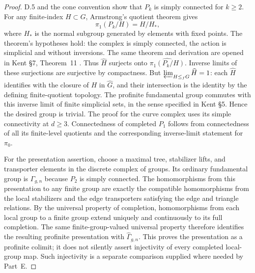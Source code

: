\begin{proof}
D.5 and the cone convention show that $P_k$ is simply connected for $k\geq2$. For any finite-index $H\subset G$, Armstrong's quotient theorem gives
\[
 \pi_1(P_k/H)=H/H_*,
\]
where $H_*$ is the normal subgroup generated by elements with fixed points. The theorem's hypotheses hold: the complex is simply connected, the action is simplicial and without inversions. The same theorem and derivation are opened in Kent \S7, Theorem~11 \cite{Kent2016}. Thus $\widehat H$ surjects onto $\widehat{\pi_1(P_k/H)}$. Inverse limits of these surjections are surjective by compactness. But $\varprojlim_{H\leq_fG}\widehat H=1$: each $\widehat H$ identifies with the closure of $H$ in $\widehat G$, and their intersection is the identity by the defining finite-quotient topology. The profinite fundamental group commutes with this inverse limit of finite simplicial sets, in the sense specified in Kent \S5. Hence the desired group is trivial. The proof for the curve complex uses its simple connectivity at $d\geq3$. Connectedness of completed $P_1$ follows from connectedness of all its finite-level quotients and the corresponding inverse-limit statement for $\pi_0$.

For the presentation assertion, choose a maximal tree, stabilizer lifts, and transporter elements in the discrete complex of groups. Its ordinary fundamental group is $\Gamma_{g,n}$ because $P_2$ is simply connected. The homomorphisms from this presentation to any finite group are exactly the compatible homomorphisms from the local stabilizers and the edge transporters satisfying the edge and triangle relations. By the universal property of completion, homomorphisms from each local group to a finite group extend uniquely and continuously to its full completion. The same finite-group-valued universal property therefore identifies the resulting profinite presentation with $\widehat\Gamma_{g,n}$. This proves the presentation as a profinite colimit; it does not silently assert injectivity of every completed local-group map. Such injectivity is a separate comparison supplied where needed by Part~E.
\end{proof}

